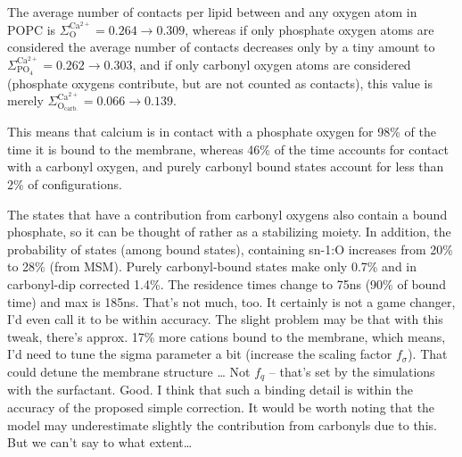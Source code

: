 \documentclass[aip,jcp,twocolumn]{revtex4}
\begin{document}
The average number of contacts per lipid between  and any oxygen atom in POPC is 
$\Sigma ^\mathrm{Ca^{2+}} _\mathrm{O} = 0.264 \rightarrow 0.309 $,
whereas if only phosphate oxygen atoms are considered 
the average number of contacts decreases only by a tiny amount to 
$\Sigma ^\mathrm{Ca^{2+}} _\mathrm{PO_4} = 0.262 \rightarrow 0.303 $,    %
and if only carbonyl oxygen atoms are considered 
(phosphate oxygens contribute, but are not counted as contacts),
this value is merely
$\Sigma ^\mathrm{Ca^{2+}} _\mathrm{O_{carb.}} = 0.066 \rightarrow 0.139 $.    %

This means that calcium is in contact with a phosphate oxygen for 98\% of the time it is bound to the membrane, 
whereas 46\% of the time accounts for contact with a carbonyl oxygen,
and purely carbonyl bound states account for less than 2\% of configurations. 

The states that have a contribution from carbonyl oxygens also contain a bound phosphate, 
so it can be thought of rather as a stabilizing moiety. 
In addition, the probability of states (among bound states), containing sn-1:O increases from 20\% to 28\% (from MSM).
Purely carbonyl-bound states make only 0.7\% and in carbonyl-dip corrected 1.4\%.
The residence times change to 75ns (90\% of bound time) and max is 185ns.
That's not much, too. It certainly is not a game changer, I'd even call it to be within accuracy. 
The slight problem may be that with this tweak, there's approx. 17\%  more cations bound to the membrane,
which means, I'd need to tune the sigma parameter a bit (increase the scaling factor $f_\sigma$). 
That could detune the membrane structure \dots
Not $f_q$ -- that's set by the simulations with the surfactant. Good.
I think that such a binding detail is within the accuracy of the proposed simple correction.
It would be worth noting that the model may underestimate slightly the contribution from carbonyls due to this. 
But we can't say to what extent\dots
\end{document}
